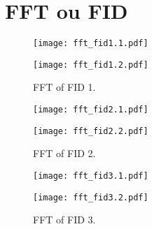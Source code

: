 \newpage
\section{FFT ou FID}



\begin{figure}[!ht]
    \centering
    \begin{minipage}[b]{0.49\textwidth}
        \centering
        \texttt{[image: fft\_fid1.1.pdf]}
    \end{minipage}
    \hfill
    \begin{minipage}[b]{0.49\textwidth}
        \centering
        \texttt{[image: fft\_fid1.2.pdf]}
    \end{minipage}
    \caption{FFT of FID 1.}
\end{figure}



\begin{figure}[!ht]
    \centering
    \begin{minipage}[b]{0.49\textwidth}
        \centering
        \texttt{[image: fft\_fid2.1.pdf]}
    \end{minipage}
    \hfill
    \begin{minipage}[b]{0.49\textwidth}
        \centering
        \texttt{[image: fft\_fid2.2.pdf]}
    \end{minipage}
    \caption{FFT of FID 2.}
\end{figure}



\begin{figure}[!ht]
    \centering
    \begin{minipage}[b]{0.49\textwidth}
        \centering
        \texttt{[image: fft\_fid3.1.pdf]}
    \end{minipage}
    \hfill
    \begin{minipage}[b]{0.49\textwidth}
        \centering
        \texttt{[image: fft\_fid3.2.pdf]}
    \end{minipage}
    \caption{FFT of FID 3.}
\end{figure}

